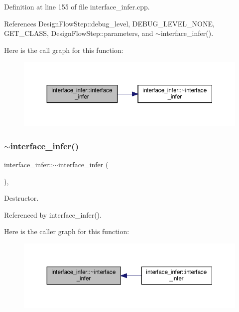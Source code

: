 Definition at line 155 of file interface\+\_\+infer.\+cpp.



References Design\+Flow\+Step\+::debug\+\_\+level, D\+E\+B\+U\+G\+\_\+\+L\+E\+V\+E\+L\+\_\+\+N\+O\+NE, G\+E\+T\+\_\+\+C\+L\+A\+SS, Design\+Flow\+Step\+::parameters, and $\sim$interface\+\_\+infer().

Here is the call graph for this function\+:
\nopagebreak
\begin{figure}[H]
\begin{center}
\leavevmode
\includegraphics[width=350pt]{d9/d8a/classinterface__infer_abb5945f2271e5c1623f8a0059e8b4fd5_cgraph}
\end{center}
\end{figure}
\mbox{\label{classinterface__infer_acc515495ed14927c97a9e414bfe97474}} 
\subsubsection{\texorpdfstring{$\sim$interface\+\_\+infer()}{~interface\_infer()}}
{\footnotesize\ttfamily interface\+\_\+infer\+::$\sim$interface\+\_\+infer (\begin{DoxyParamCaption}{ }\end{DoxyParamCaption})\hspace{0.3cm}{\ttfamily [override]}, {\ttfamily [default]}}



Destructor. 



Referenced by interface\+\_\+infer().

Here is the caller graph for this function\+:
\nopagebreak
\begin{figure}[H]
\begin{center}
\leavevmode
\includegraphics[width=350pt]{d9/d8a/classinterface__infer_acc515495ed14927c97a9e414bfe97474_icgraph}
\end{center}
\end{figure}


